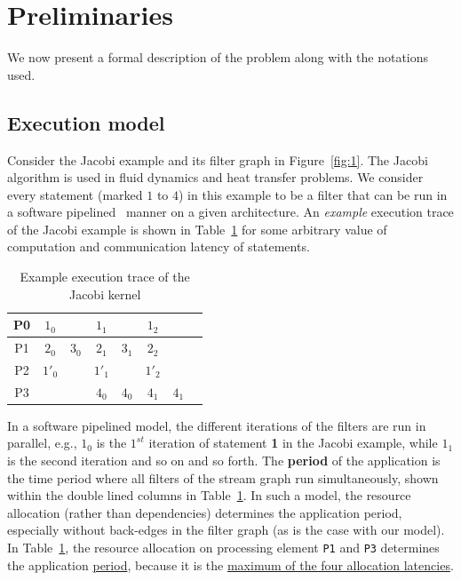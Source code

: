 \documentclass[10pt, conference, compsocconf, reqno]{IEEEtran}
\begin{document}
\section{Preliminaries}
\label{sec:preliminaries}

We now present a formal description of the problem along with the
notations used.

\subsection{Execution model}
\label{sec:execution-model}

Consider the Jacobi example and its filter graph in
Figure~\ref{fig:1}. The Jacobi algorithm is used in fluid dynamics and
heat transfer problems. We consider every statement (marked $1$ to $4$)
in this example to be a filter that can be run in a software
pipelined~\cite{audu09} manner on a given architecture. An
\textit{example} execution trace of the Jacobi example is shown in
Table~\ref{tab:3} for some arbitrary value of computation and
communication latency of statements.

\begin{table}[h!]
  \centering
  \begin{tabular}{|c|c|c||c|c||c|c|c|}
    \hline
    P0 & $1_0$ & & $1_1$ & & $1_2$ & & \\
    \hline
    P1 & $2_0$ & $3_0$ & $2_1$ & $3_1$ & $2_2$ & &\\
    \hline
    P2 & $1'_0$ & & $1'_1$ & & $1'_2$ & &\\
    \hline
    P3 & & & $4_0$ & $4_0$ & $4_1$ & $4_1$ & \\
    \hline
  \end{tabular}
  \caption{Example execution trace of the Jacobi kernel}
  \label{tab:3}
\end{table}

In a software pipelined model, the different iterations of the filters
are run in parallel, e.g., $1_0$ is the $1^{st}$ iteration of statement
\textbf{1} in the Jacobi example, while $1_1$ is the second iteration and so on
and so forth. The \textbf{period} of the application is the time period
where all filters of the stream graph run simultaneously, shown within
the double lined columns in Table~\ref{tab:3}. In such a model, the
resource allocation (rather than dependencies) determines the
application period, especially without back-edges in the filter graph
(as is the case with our model). In Table~\ref{tab:3}, the resource
allocation on processing element \texttt{P1} and \texttt{P3} determines the
application \underline{period}, because it is the \underline{maximum of the
four allocation latencies}.
\end{document}
